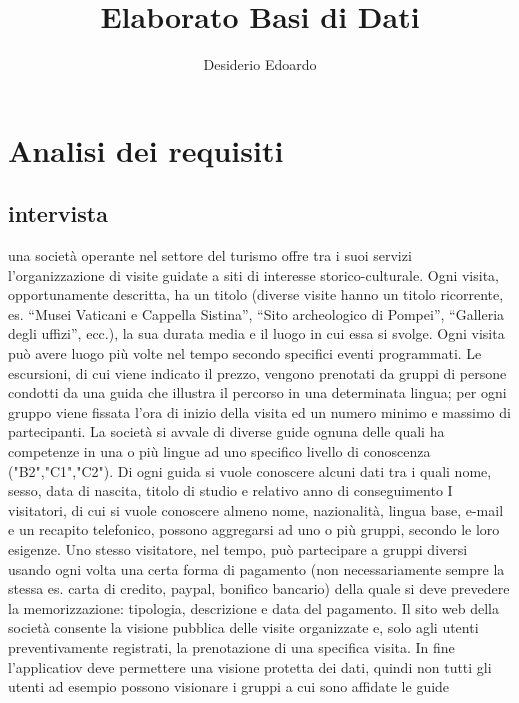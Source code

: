 \documentclass[a4paper,12pt]{report}
\title{Elaborato Basi di Dati}
\author{Desiderio Edoardo}
\begin{document}
\maketitle
\titlepage
\tableofcontents
\newpage

\chapter{Analisi dei requisiti}

\section{intervista}
una	 società	 operante	 nel	 settore	 del	 turismo	 offre	 tra	 i	 suoi	 servizi	 l’organizzazione	 di	 	 visite	
guidate	a	siti	di	interesse	storico-culturale.
Ogni	visita,	opportunamente	descritta,	ha	un	 titolo	 (diverse	visite	hanno	un	 titolo	 ricorrente,	es.	
“Musei	Vaticani	e	Cappella	Sistina”,	“Sito	archeologico	di	Pompei”,	“Galleria	degli	uffizi”,	ecc.),	la	
sua	durata	media		e	il	luogo		in	cui	essa	si	svolge.	Ogni	visita	può	avere	luogo	più	volte	nel	tempo	
secondo	specifici	eventi	programmati.
Le escursioni,	di	cui	viene	indicato	il	prezzo,	vengono	prenotati	da	gruppi	di	persone	condotti	da	una	
guida	che	illustra	il	percorso	in	una	determinata	lingua;	per	ogni	gruppo	viene	fissata	l’ora	di	inizio	
della	visita	ed	un	numero	minimo	e	massimo	di	partecipanti.
La	società	si	avvale	di	diverse	guide	ognuna	delle	quali	ha	competenze	in	una	o	più	lingue	ad	uno	
specifico	 livello	 di	 conoscenza	 ("B2","C1","C2"). Di	 ogni	 guida	 si	 vuole	
conoscere	 alcuni	 dati	 tra	 i	 quali	 nome,	 sesso,	 data	 di	 nascita,	 titolo	 di	 studio	 e	 relativo	 anno	 di	
conseguimento
I	visitatori,	di	cui	si	vuole	conoscere	almeno	nome,	nazionalità,	lingua	base,	e-mail	e	un	 recapito	
telefonico,	 possono	 aggregarsi	 ad	 uno	 o	 più	 gruppi,	 secondo	 le	 loro	 esigenze.	 Uno	 stesso	
visitatore,	 nel	 tempo,	 può	 partecipare	 a	 gruppi	 diversi	 usando	 ogni	 volta	 una	 certa	 forma	 di	
pagamento	(non	necessariamente	sempre	la	stessa	es.	carta	di	credito,	paypal,	bonifico	bancario)	
della	quale	si	deve	prevedere	la	memorizzazione:	tipologia,	descrizione	e	data	del	pagamento.
Il	 sito	 web	 della	 società	 consente	 la	 visione	 pubblica	 delle	 visite	 organizzate	 e,	 solo	 agli	 utenti	
preventivamente	registrati,	la	prenotazione	di	una	specifica	visita. In fine l'applicatiov
deve permettere una visione protetta dei dati, quindi non tutti gli utenti ad esempio possono
visionare i gruppi a cui sono affidate le guide 
\end{document}
